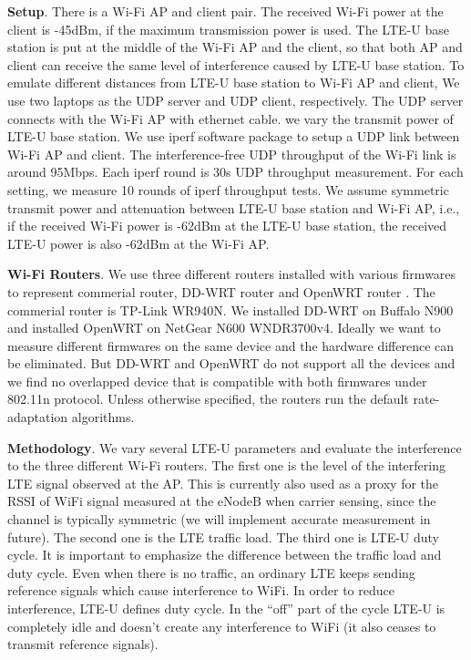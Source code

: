 



\textbf{Setup}. There is a Wi-Fi AP and client pair. The received Wi-Fi power at the 
client is -45dBm, if the maximum transmission power is used. 
The LTE-U base station is put at the middle of the Wi-Fi AP
and the client, so that both AP and client can receive the same level of interference
caused by LTE-U base station. 
To emulate different distances from LTE-U base station to Wi-Fi AP and client,
We use two laptops as the UDP server and UDP client, respectively. 
The UDP server connects with the Wi-Fi AP with ethernet cable. 
we vary the transmit power of LTE-U base station. 
We use iperf software package to setup a UDP link between Wi-Fi AP and client. 
The interference-free UDP throughput of the Wi-Fi link is around 95Mbps.
Each iperf round is 30s UDP throughput measurement. 
For each setting, we measure 10 rounds of iperf throughput tests. 
We assume symmetric transmit power and attenuation between LTE-U base station
and Wi-Fi AP, i.e., if the received Wi-Fi power is -62dBm at the 
LTE-U base station, the received LTE-U power is also -62dBm at the Wi-Fi AP. 



\textbf{Wi-Fi Routers}. 
We use three different routers installed with various firmwares to represent
commerial router, DD-WRT router \cite{ddwrt} and OpenWRT router \cite{openwrt}. 
The commerial router is TP-Link WR940N. 
We installed DD-WRT on Buffalo N900 and 
installed OpenWRT on NetGear N600 WNDR3700v4.
Ideally we want to measure different firmwares on the same 
device and the hardware difference can be eliminated. 
But DD-WRT and OpenWRT do not support all the devices
and we find no overlapped device that is 
compatible with both firmwares under 802.11n protocol.
Unless otherwise specified, the routers run the default rate-adaptation algorithms. 



\textbf{Methodology}.
We vary several LTE-U parameters and evaluate the interference
to the three different Wi-Fi routers. 
The first one is the level of the interfering LTE signal observed at the AP. 
This is currently also used as a proxy for the RSSI of WiFi signal measured at the eNodeB when carrier sensing, 
since the channel is typically symmetric (we will implement accurate measurement in future). The second one is the LTE traffic load. The third one is LTE-U duty cycle. 
It is important to emphasize the difference between the traffic load and duty cycle. 
Even when there is no traffic, an ordinary LTE keeps sending reference signals which cause interference to WiFi. 
In order to reduce interference, LTE-U defines duty cycle. 
In the ``off'' part of the cycle LTE-U is completely idle 
and doesn't create any interference to WiFi (it also ceases to transmit reference signals).



